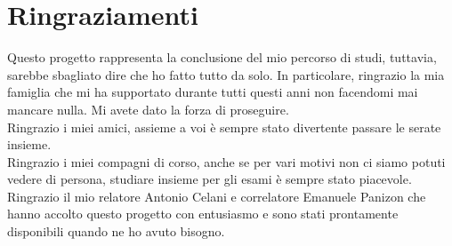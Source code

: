 \chapter*{Ringraziamenti}

Questo progetto rappresenta la conclusione del mio percorso di studi, tuttavia, sarebbe sbagliato dire che ho fatto tutto da solo. In particolare, ringrazio la mia famiglia che mi ha supportato durante tutti questi anni non facendomi mai mancare nulla. Mi avete dato la forza di proseguire.\\
Ringrazio i miei amici, assieme a voi è sempre stato divertente passare le serate insieme.\\
Ringrazio i miei compagni di corso, anche se per vari motivi non ci siamo potuti vedere di persona, studiare insieme per gli esami è sempre stato piacevole.\\
Ringrazio il mio relatore Antonio Celani e correlatore Emanuele Panizon che hanno accolto questo progetto con entusiasmo e sono stati prontamente disponibili quando ne ho avuto bisogno.\\
